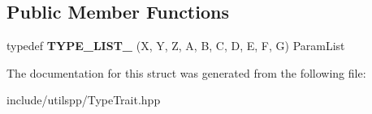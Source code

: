 \subsection*{Public Member Functions}
\begin{DoxyCompactItemize}
\item 
\hypertarget{structutilspp_1_1PointerOnMemberFunction_3_01W_07V_1_1_5_08_07X_00_01Y_00_01Z_00_01A_00_01B_00_052975cfd5a0b2be63fce3f8de7f60f64_a33a00368e29d29377650356fc85eaa37}{typedef {\bfseries T\-Y\-P\-E\-\_\-\-L\-I\-S\-T\-\_} (X, Y, Z, A, B, C, D, E, F, G) Param\-List}\label{structutilspp_1_1PointerOnMemberFunction_3_01W_07V_1_1_5_08_07X_00_01Y_00_01Z_00_01A_00_01B_00_052975cfd5a0b2be63fce3f8de7f60f64_a33a00368e29d29377650356fc85eaa37}

\end{DoxyCompactItemize}


The documentation for this struct was generated from the following file\-:\begin{DoxyCompactItemize}
\item 
include/utilspp/Type\-Trait.\-hpp\end{DoxyCompactItemize}
